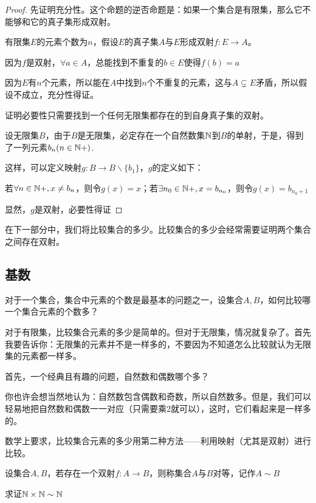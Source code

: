 \begin{proof}
    先证明充分性。这个命题的逆否命题是：如果一个集合是有限集，那么它不能够和它的真子集形成双射。

    有限集$E$的元素个数为$n$，假设$E$的真子集$A$与$E$形成双射$f:E\rightarrow A$。

    因为$f$是双射，$\forall a\in A$，总能找到不重复的$b\in E$使得$f(b) = a$

    因为$E$有$n$个元素，所以能在$A$中找到$n$个不重复的元素，这与$A\subsetneq E$矛盾，所以假设不成立，充分性得证。

    证明必要性只需要找到一个任何无限集都存在的到自身真子集的双射。

    设无限集$B$，由于$B$是无限集，必定存在一个自然数集$\mathbb{N}$到$B$的单射，于是，得到了一列元素${b_n}(n\in \mathbb{N}+)$.

    这样，可以定义映射$g:B\rightarrow B\backslash\{b_1\}$，$g$的定义如下：

    若$\forall n\in \mathbb{N}+,x\neq b_n$，则令$g(x) = x$；若$\exists  n_0\in\mathbb{N}+,x = b_{n_0}$，则令$g(x) = b_{n_0+1}$

    显然，$g$是双射，必要性得证
\end{proof}

在下一部分中，我们将比较集合的多少。比较集合的多少会经常需要证明两个集合之间存在双射。

\subsection{基数}

对于一个集合，集合中元素的个数是最基本的问题之一，设集合$A,B$，如何比较哪一个集合元素的个数多？

对于有限集，比较集合元素的多少是简单的。但对于无限集，情况就复杂了。首先我要告诉你：无限集的元素并不是一样多的，不要因为不知道怎么比较就认为无限集的元素都一样多。

首先，一个经典且有趣的问题，自然数和偶数哪个多？

你也许会想当然地认为：自然数包含偶数和奇数，所以自然数多。但是，我们可以轻易地把自然数和偶数一一对应（只需要乘2就可以），这时，它们看起来是一样多的。

数学上要求，比较集合元素的多少用第二种方法——利用映射（尤其是双射）进行比较。

\begin{definition}
    设集合$A,B$，若存在一个双射$f:A\rightarrow B$，则称集合$A$与$B$对等，记作$A\sim B$
\end{definition}

\begin{example}
    求证$\mathbb{N} \times \mathbb{N} \sim \mathbb{N}$
\end{example}

